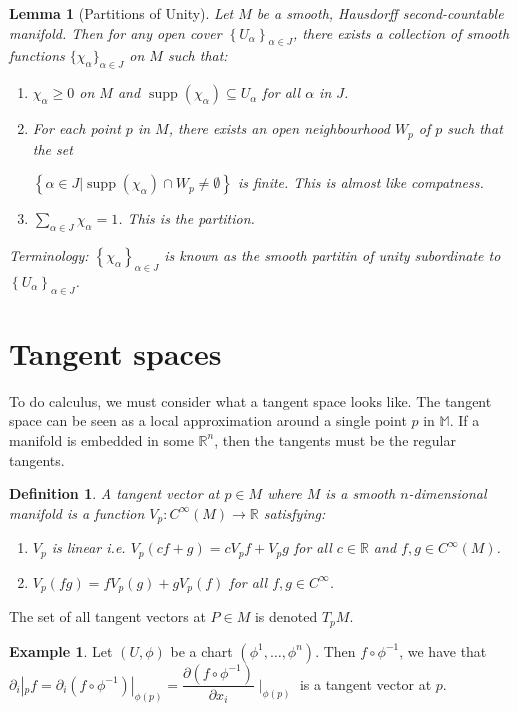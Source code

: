 \documentclass{article}
\newtheorem{lemma}[theorem]{Lemma}
\newtheorem{definition}[theorem]{Definition}
\theoremstyle{definition}
\newtheorem{example}[theorem]{Example}
\numberwithin{theorem}{section}
\numberwithin{equation}{section}
\DeclareMathOperator{\supp}{supp}
\begin{document}
\begin{lemma}[Partitions of Unity]
	Let $M$ be a smooth, Hausdorff second-countable manifold. Then for any open cover $\left\{U_\alpha \right\}_{\alpha \in J}$, there exists a collection of smooth functions $\{\chi_\alpha \}_{\alpha \in J}$ on $M$ such that:
	\begin{enumerate}
		\item $\chi_\alpha \geq 0$ on $M$ and $\supp (\chi_\alpha) \subseteq U_\alpha$ for all $\alpha$ in $J$. 
		\item For each point $p$ in $M$, there exists an open neighbourhood $W_p$ of $p$ such that the set 
		
		$\left\{\alpha \in J | \supp(\chi_\alpha) \cap W_p \neq \emptyset\right\}$ is finite. This is almost like compatness.
		\item $\sum_{\alpha \in J} \chi_\alpha = 1$. This is the partition.
	\end{enumerate}
	Terminology: $\left\{ \chi_\alpha \right\}_{\alpha \in J}$ is known as the smooth partitin of unity subordinate to $\left\{U_\alpha \right\}_{\alpha \in J}$.
\end{lemma}


\section{Tangent spaces}

To do calculus, we must consider what a tangent space looks like. The tangent space can be seen as a local approximation around a single point $p$ in $\mathbb{M}$. If a manifold is embedded in some $\mathbb{R}^n$, then the tangents must be the regular tangents. 

\begin{definition}
	A tangent vector at $p \in M$ where $M$ is a smooth $n$-dimensional manifold is a function $V_p : C^\infty(M) \rightarrow \mathbb{R}$ satisfying:
	\begin{enumerate}
		\item $V_p$ is linear i.e. $V_p(c f + g) = c V_p f + V_p g$ for all $c \in \mathbb{R}$ and $f, g \in C^\infty(M)$. 
		\item $V_p(fg) = fV_p(g) + g V_p (f)$ for all $f, g \in C^\infty$. 
	\end{enumerate}
\end{definition}
The set of all tangent vectors at $P \in M$ is denoted $T_p M$. 

\begin{example}
	Let $(U, \phi)$ be a chart $(\phi^1, \ldots, \phi^n)$. Then
	$f \circ \phi^{-1}$, we have that $\partial_i|_p f = \partial_i(f \circ \phi^{-1})|_{\phi(p)} = \dfrac{\partial (f \circ \phi^{-1})}{\partial x_i}\mid_{\phi(p)}$ is a tangent vector at $p$. 
\end{example}
\end{document}
